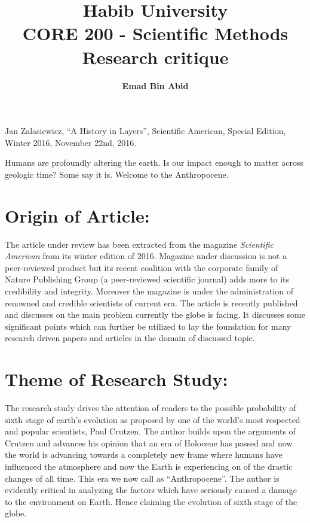 \documentclass{article}
\title{\textbf{Habib University}\\ \textbf{CORE 200 - Scientific Methods}\\ \textbf{Research critique}}
\author{\textbf{Emad Bin Abid}}
\begin{document}
\maketitle



Jan Zalasiewicz, “A History in Layers”, Scientific American, Special Edition, Winter 2016, November 22nd, 2016.\\

\begin{center}
	Humans are profoundly altering the earth. Is our impact enough to matter
	across geologic time? Some say it is. Welcome to the Anthropocene.\cite{quote}
\end{center}

\section*{Origin of Article:}
The article under review has been extracted from the magazine \textit{Scientific American } from its winter edition of 2016. Magazine under discussion is not a peer-reviewed product but its recent coalition with the corporate family of Nature Publishing Group (a peer-reviewed scientific journal) adds more to its credibility and integrity. Moreover the magazine is under the administration of renowned and credible scientists of current era. The article is recently published and discusses on the main problem currently the globe is facing. It discusses some significant points which can further be utilized to lay the foundation for many research driven papers and articles in the domain of discussed topic. 

\section*{Theme of Research Study:}
The research study drives the attention of readers to the possible probability of sixth stage of earth’s evolution as proposed by one of the world’s most respected and popular scientists, Paul Crutzen. The author builds upon the arguments of Crutzen and advances his opinion that an era of Holocene has passed and now the world is advancing towards a completely new frame where humans have influenced the atmosphere and now the Earth is experiencing on of the drastic changes of all time. This era we now call as “Anthropocene”. The author is evidently critical in analyzing the factors which have seriously caused a damage to the environment on Earth. Hence claiming the evolution of sixth stage of the globe. 
	
\end{document}
